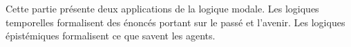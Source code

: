 \documentclass[../../include/open-logic-part]{subfiles}
\begin{document}

Cette partie présente deux applications de la logique modale. Les
logiques temporelles formalisent des énoncés portant sur le passé et
l'avenir. Les logiques épistémiques formalisent ce que savent les agents.



\OLEndPartHook
\end{document}
